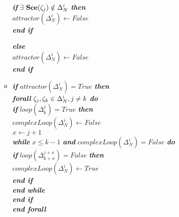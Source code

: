 \begin{algorithm}[p]
\begin{itemize}
\begin{itemize}
							\hspace{1.2cm} \textbf{\textit{if}} $\exists$ $\mathbf{Sce}(\zeta_j) \notin  \Delta_N^i$ \textbf{\textit{then}} \\ \hspace{1.7cm} $attractor(\Delta_N^i) \longleftarrow False$ \\
							\hspace{1.2cm} \textbf{\textit{end if}} 
							
							\textbf{\textit{else}} \\
							\hspace{0.7cm} $attractor(\Delta_N^i) \longleftarrow False$ \\
							\textbf{\textit{end if}} 
														
					\item[] \textbf{\textit{if}} $attractor(\Delta_N^i) = True$ \textbf{\textit{then}}\\
						\hspace{0.7cm} \textbf{\textit{forall}} $\zeta_j, \zeta_k \in \Delta_N^i, j \neq k$ \textbf{\textit{do}} \\								
								\hspace{1.2cm} \textbf{\textit{if}} $loop(\Delta_k^j) = True$ \textbf{\textit{then}}\\
									\hspace{1.7cm} $complexLoop(\Delta_N^i) \longleftarrow False$ \\
									\hspace{1.7cm} $x \longleftarrow j+1$ \\									
									\hspace{1.7cm} \textbf{\textit{while}} $x \leq k-1 $ \textbf{\textit{and}} $complexLoop(\Delta_N^i) = False$ \textbf{\textit{do}} \\	
									
										\hspace{2.1cm} \textbf{\textit{if}} $loop(\Delta_{k+x}^{j+x}) = False$ \textbf{\textit{then}}\\
											\hspace{2.5cm} $complexLoop(\Delta_N^i) \longleftarrow True$ \\
										\hspace{2.1cm} \textbf{\textit{end if}} \\
									\hspace{1.7cm} \textbf{\textit{end while}} \\
								\hspace{1.2cm} \textbf{\textit{end if}} \\
						\hspace{0.7cm} \textbf{\textit{end forall}} 	\\


\end{itemize}
\end{itemize}
\end{algorithm}
